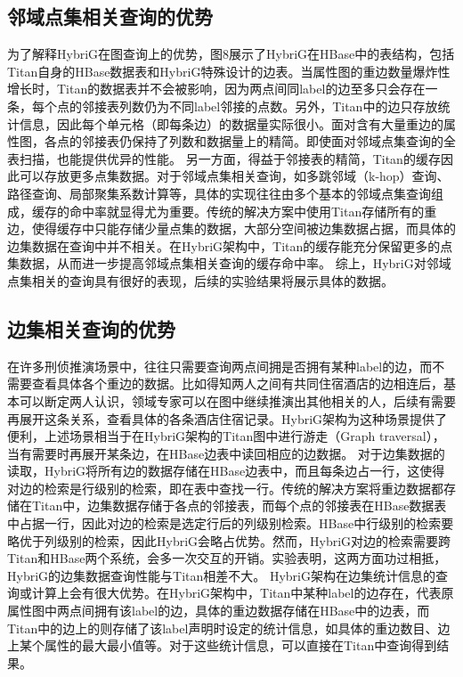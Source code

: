 \subsection{邻域点集相关查询的优势}
为了解释HybriG在图查询上的优势，图8展示了HybriG在HBase中的表结构，包括Titan自身的HBase数据表和HybriG特殊设计的边表。当属性图的重边数量爆炸性增长时，Titan的数据表并不会被影响，因为两点间同label的边至多只会存在一条，每个点的邻接表列数仍为不同label邻接的点数。另外，Titan中的边只存放统计信息，因此每个单元格（即每条边）的数据量实际很小。面对含有大量重边的属性图，各点的邻接表仍保持了列数和数据量上的精简。即使面对邻域点集查询的全表扫描，也能提供优异的性能。
另一方面，得益于邻接表的精简，Titan的缓存因此可以存放更多点集数据。对于邻域点集相关查询，如多跳邻域（k-hop）查询、路径查询、局部聚集系数计算等，具体的实现往往由多个基本的邻域点集查询组成，缓存的命中率就显得尤为重要。传统的解决方案中使用Titan存储所有的重边，使得缓存中只能存储少量点集的数据，大部分空间被边集数据占据，而具体的边集数据在查询中并不相关。在HybriG架构中，Titan的缓存能充分保留更多的点集数据，从而进一步提高邻域点集相关查询的缓存命中率。
综上，HybriG对邻域点集相关的查询具有很好的表现，后续的实验结果将展示具体的数据。

\subsection{边集相关查询的优势}
在许多刑侦推演场景中，往往只需要查询两点间拥是否拥有某种label的边，而不需要查看具体各个重边的数据。比如得知两人之间有共同住宿酒店的边相连后，基本可以断定两人认识，领域专家可以在图中继续推演出其他相关的人，后续有需要再展开这条关系，查看具体的各条酒店住宿记录。HybriG架构为这种场景提供了便利，上述场景相当于在HybriG架构的Titan图中进行游走（Graph traversal），当有需要时再展开某条边，在HBase边表中读回相应的边数据。
对于边集数据的读取，HybriG将所有边的数据存储在HBase边表中，而且每条边占一行，这使得对边的检索是行级别的检索，即在表中查找一行。传统的解决方案将重边数据都存储在Titan中，边集数据存储于各点的邻接表，而每个点的邻接表在HBase数据表中占据一行，因此对边的检索是选定行后的列级别检索。HBase中行级别的检索要略优于列级别的检索，因此HybriG会略占优势。然而，HybriG对边的检索需要跨Titan和HBase两个系统，会多一次交互的开销。实验表明，这两方面功过相抵，HybriG的边集数据查询性能与Titan相差不大。
HybriG架构在边集统计信息的查询或计算上会有很大优势。在HybriG架构中，Titan中某种label的边存在，代表原属性图中两点间拥有该label的边，具体的重边数据存储在HBase中的边表，而Titan中的边上的则存储了该label声明时设定的统计信息，如具体的重边数目、边上某个属性的最大最小值等。对于这些统计信息，可以直接在Titan中查询得到结果。



